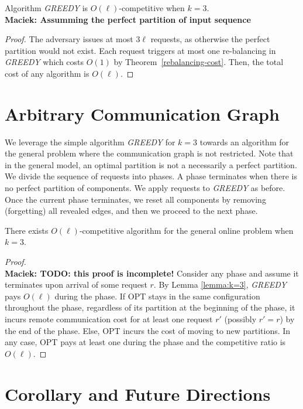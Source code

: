 \documentclass[manuscript,screen=true]{acmart}
\newcommand\maciek[1]{\color{brown}\textbf{\\ Maciek: #1}\color{black}}
\begin{document}
  
\begin{theorem}
  Algorithm \emph{GREEDY} is $O(\ell)$-competitive when $k=3$.
  \maciek{Assumming the perfect partition of input sequence}
\end{theorem}

\begin{proof}
	The adversary issues at most $3\ell$ requests, as otherwise the perfect partition would not exist.
	Each request triggers at most one re-balancing in \emph{GREEDY}
	which costs $O(1)$ by Theorem~\ref{rebalancing-cost}.
	Then,
	the total cost of any algorithm is $O(\ell)$.
\end{proof}

\section{Arbitrary Communication Graph} \label{sec:generalModel}

We leverage the simple algorithm \emph{GREEDY} for $k=3$
towards an algorithm for the general problem
where the communication graph is not restricted.
Note that in the general model,
an optimal partition is not a necessarily a perfect partition.
We divide the sequence of requests into phases.
A phase terminates when there is no perfect partition of components.
We apply requests to \emph{GREEDY} as before. 
Once the current phase terminates,
we reset all components by removing (forgetting) all revealed edges,
and then we proceed to the next phase.

\begin{theorem} \label{cor:k=3}
	There exists $O(\ell)$-competitive algorithm for the general online problem when $k=3$. 
\end{theorem}
\begin{proof}
  \maciek{TODO: this proof is incomplete!}
	Consider any phase and assume it terminates upon arrival of some request $r$.
	By Lemma  \ref{lemma:k=3},
	\emph{GREEDY} pays $O(\ell)$ during the phase.
	If OPT stays in the same configuration throughout the phase,
	regardless of its partition at the beginning of the phase,        
	it incurs remote communication cost for at least one request $r'$ (possibly $r'=r$) by the end of the phase.
	Else,
	OPT incurs the cost of moving to new partitions.
	In any case,
	OPT pays at least one during the phase and 
	the competitive ratio is $O(\ell)$.
\end{proof}


\section{Corollary and Future Directions}
\end{document}

